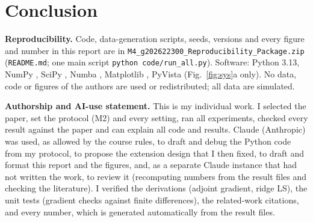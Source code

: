 \documentclass[10pt,a4paper,twocolumn]{article}
\begin{document}
\section{Conclusion}


{\footnotesize

\setlength{\bibsep}{1pt}
}

{\footnotesize\raggedright\textbf{Reproducibility.} Code, data-generation scripts, seeds, versions and every
figure and number in this report are in \texttt{M4\_g202622300\_\allowbreak Reproducibility\_\allowbreak Package.zip} (\texttt{README.md}; one main script
\texttt{python code/run\_all.py}). Software: Python 3.13, NumPy \citep{Harris2020}, SciPy \citep{Virtanen2020},
Numba \citep{Lam2015}, Matplotlib \citep{Hunter2007}, PyVista \citep{Sullivan2019} (Fig.~\ref{fig:sys}a only).
No data, code or figures of the authors are used or redistributed; all data are simulated.

\textbf{Authorship and AI-use statement.} This is my individual work. I selected the paper, set the
protocol (M2) and every setting, ran all experiments, checked every result against the paper and can explain
all code and results. Claude (Anthropic) was used, as allowed by the course rules, to draft and debug the
Python code from my protocol, to propose the extension design that I then fixed, to draft and format this
report and the figures, and, as a separate Claude instance that had not written the work, to review it
(recomputing numbers from the result files and checking the literature). I verified the derivations (adjoint
gradient, ridge LS), the unit tests (gradient checks against finite differences), the related-work citations,
and every number, which is generated automatically from the result files.\par}
\end{document}
